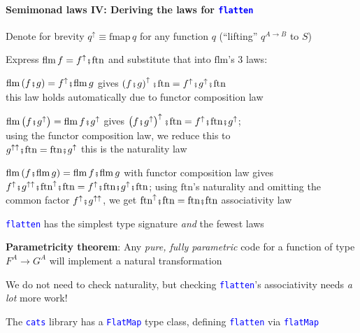 \paragraph{Semimonad laws IV: Deriving the laws for \texttt{\textcolor{blue}{\footnotesize{}flatten}} }

Denote for brevity $q^{\uparrow}\equiv\text{fmap}\,q$ for any function
$q$ (``lifting'' $q^{A\rightarrow B}$ to $S$)

Express $\text{flm}\,f=f^{\uparrow}\bef\text{ftn}$ and substitute
that into $\text{flm}$'s 3 laws:

{\footnotesize{}$\text{flm}\left(f\bef g\right)=f^{\uparrow}\bef\text{flm}\,g$}
gives {\footnotesize{}$\left(f\bef g\right)^{\uparrow}\bef\text{ftn}=f^{\uparrow}\bef g^{\uparrow}\bef\text{ftn}$}\\
\textendash{} this law holds automatically due to functor composition
law

{\footnotesize{}$\text{flm}\left(f\bef g^{\uparrow}\right)=\text{flm}\,f\bef g^{\uparrow}$}
gives {\footnotesize{}$\left(f\bef g^{\uparrow}\right)^{\uparrow}\bef\text{ftn}=f^{\uparrow}\bef\text{ftn}\bef g^{\uparrow}$};\\
using the functor composition law, we reduce this to\\
{\footnotesize{}$g^{\uparrow\uparrow}\bef\text{ftn}=\text{ftn}\bef g^{\uparrow}$}
\textendash{} this is the naturality law

{\footnotesize{}$\text{flm}\left(f\bef\text{flm}\,g\right)=\text{flm}\,f\bef\text{flm}\,g$
}with functor composition law gives{\footnotesize{} $f^{\uparrow}\bef g^{\uparrow\uparrow}\bef\text{ftn}^{\uparrow}\bef\text{ftn}=f^{\uparrow}\bef\text{ftn}\bef g^{\uparrow}\bef\text{ftn}$;}
using {\footnotesize{}$\text{ftn}$}'s naturality and omitting the
common factor{\footnotesize{} $f^{\uparrow}\bef g^{\uparrow\uparrow}$},
we get{\footnotesize{} $\text{ftn}^{\uparrow}\bef\text{ftn}=\text{ftn}\bef\text{ftn}$}
\textendash{} associativity law

\texttt{\textcolor{blue}{\footnotesize{}flatten}} has the simplest
type signature \emph{and} the fewest laws

\textbf{Parametricity theorem}: Any \emph{pure, fully parametric}
code for a function of type $F^{A}\rightarrow G^{A}$ will implement
a natural transformation

We do not need to check naturality, but checking \texttt{\textcolor{blue}{\footnotesize{}flatten}}'s
associativity needs \emph{a lot} more work!

The \texttt{\textcolor{blue}{\footnotesize{}cats}} library has a \texttt{\textcolor{blue}{\footnotesize{}FlatMap}}
type class, defining \texttt{\textcolor{blue}{\footnotesize{}flatten}}
via \texttt{\textcolor{blue}{\footnotesize{}flatMap}} 


